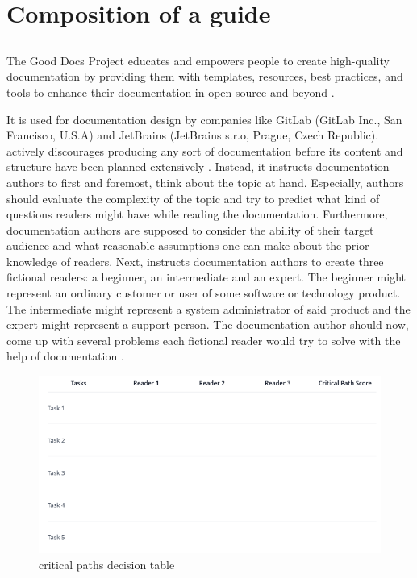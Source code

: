 \section{Composition of a guide}
\label{s:guide-creation}

\subsection{\good}
\label{s:b-gooddocs}
\begin{displayquote}
	The Good Docs Project educates and empowers people to create high-quality documentation by providing them with templates, resources, best practices, and tools to enhance their documentation in open source and beyond \cite{shorterGoodDocsProject2024}.
\end{displayquote}
It is used for documentation design by companies like GitLab (GitLab Inc., San Francisco, U.S.A) and JetBrains (JetBrains s.r.o, Prague, Czech Republic).
\good\space actively discourages producing any sort of documentation before its content and structure have been planned extensively \cite{shorterGoodDocsProject2024}.
Instead, it instructs documentation authors to first and foremost, think about the topic at hand.
Especially, authors should evaluate the complexity of the topic and try to predict what kind of questions readers might have while reading the documentation.
Furthermore, documentation authors are supposed to consider the ability of their target audience and what reasonable assumptions one can make about the prior knowledge of 
readers.
Next, \good\space instructs documentation authors to create three fictional readers: a beginner, an intermediate and an expert.
The beginner might represent an ordinary customer or user of some software or technology product.
The intermediate might represent a system administrator of said product 
and the expert might represent a support person.
The documentation author should now, come up with several problems each fictional reader would try to solve with the help of documentation \cite{shorterGoodDocsProject2024}.
\begin{figure}[h]
	\centerline{
		\includegraphics[scale=0.5]{images/gd_dt.png}}
	\caption{\good\space critical paths decision table \cite{shorterGoodDocsProject2024}}
	\label{fig:dg-dt}
\end{figure}

